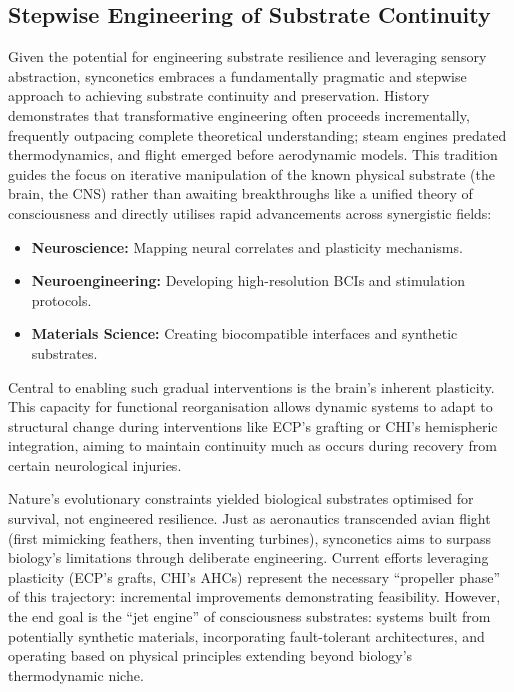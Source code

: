 \documentclass[10pt]{article}
\begin{document}
\begin{sloppypar}
  \subsection{Stepwise Engineering of Substrate Continuity}
  \label{sec:pragmatic-path-forward}

  Given the potential for engineering substrate resilience and leveraging sensory abstraction, synconetics embraces a fundamentally pragmatic and stepwise approach to achieving substrate continuity and preservation. History demonstrates that transformative engineering often proceeds incrementally, frequently outpacing complete theoretical understanding; steam engines predated thermodynamics, and flight emerged before aerodynamic models. This tradition guides the focus on iterative manipulation of the known physical substrate (the brain, the CNS) rather than awaiting breakthroughs like a unified theory of consciousness and directly utilises rapid advancements across synergistic fields:

  \begin{itemize}
    \item \textbf{Neuroscience:} Mapping neural correlates and plasticity mechanisms.
    \item \textbf{Neuroengineering:} Developing high-resolution BCIs and stimulation protocols.
    \item \textbf{Materials Science:} Creating biocompatible interfaces and synthetic substrates.
  \end{itemize}

  Central to enabling such gradual interventions is the brain’s inherent plasticity. This capacity for functional reorganisation allows dynamic systems to adapt to structural change during interventions like ECP’s grafting or CHI’s hemispheric integration, aiming to maintain continuity much as occurs during recovery from certain neurological injuries.

  Nature’s evolutionary constraints yielded biological substrates optimised for survival, not engineered resilience. Just as aeronautics transcended avian flight (first mimicking feathers, then inventing turbines), synconetics aims to surpass biology’s limitations through deliberate engineering. Current efforts leveraging plasticity (ECP’s grafts, CHI’s AHCs) represent the necessary “propeller phase” of this trajectory: incremental improvements demonstrating feasibility. However, the end goal is the “jet engine” of consciousness substrates: systems built from potentially synthetic materials, incorporating fault-tolerant architectures, and operating based on physical principles extending beyond biology’s thermodynamic niche.


\end{sloppypar}
\end{document}
